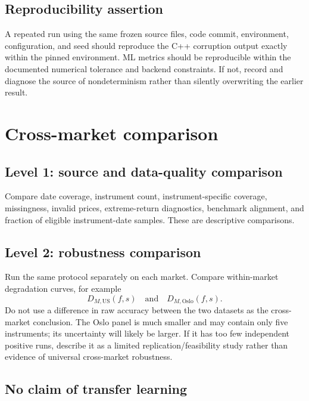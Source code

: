 \documentclass[11pt,a4paper]{article}
\newcommand{\US}{\text{US}}
\newcommand{\OS}{\text{Oslo}}
\begin{document}
\subsection{Reproducibility assertion}

A repeated run using the same frozen source files, code commit, environment, configuration, and seed should reproduce the C++ corruption output exactly within the pinned environment. ML metrics should be reproducible within the documented numerical tolerance and backend constraints. If not, record and diagnose the source of nondeterminism rather than silently overwriting the earlier result.

\section{Cross-market comparison}
\label{sec:crossmarket}

\subsection{Level 1: source and data-quality comparison}

Compare date coverage, instrument count, instrument-specific coverage, missingness, invalid prices, extreme-return diagnostics, benchmark alignment, and fraction of eligible instrument-date samples. These are descriptive comparisons.

\subsection{Level 2: robustness comparison}

Run the same protocol separately on each market. Compare within-market degradation curves, for example
\begin{equation}
  D_{M,\US}(f,s)\quad\text{and}\quad D_{M,\OS}(f,s).
\end{equation}
Do not use a difference in raw accuracy between the two datasets as the cross-market conclusion. The Oslo panel is much smaller and may contain only five instruments; its uncertainty will likely be larger. If it has too few independent positive runs, describe it as a limited replication/feasibility study rather than evidence of universal cross-market robustness.

\subsection{No claim of transfer learning}
\end{document}
